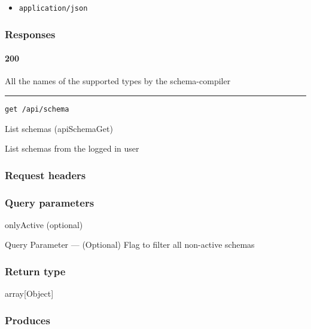 \begin{itemize}
\tightlist
\item
  \texttt{application/json}
\end{itemize}

\hypertarget{responses-141}{%
\subsubsection{Responses}\label{responses-141}}

\hypertarget{section-459}{%
\paragraph{200}\label{section-459}}

All the names of the supported types by the schema-compiler

\begin{center}\rule{0.5\linewidth}{\linethickness}\end{center}

\protect\hypertarget{apiSchemaGet}{}{}

\begin{verbatim}
get /api/schema
\end{verbatim}

List schemas ({apiSchemaGet})

List schemas from the logged in user

\hypertarget{request-headers-74}{%
\subsubsection{Request headers}\label{request-headers-74}}

\hypertarget{query-parameters-5}{%
\subsubsection{Query parameters}\label{query-parameters-5}}

onlyActive (optional)

{Query Parameter} --- (Optional) Flag to filter all non-active schemas

\hypertarget{return-type-108}{%
\subsubsection{Return type}\label{return-type-108}}

array{[}Object{]}

\hypertarget{produces-139}{%
\subsubsection{Produces}\label{produces-139}}

